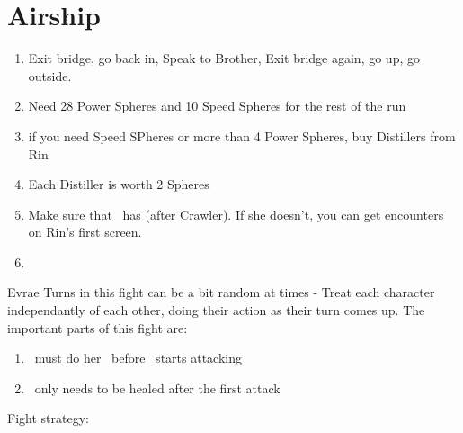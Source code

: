 \chapter{Airship}

\begin{enumerate}
    \item Exit bridge, go back in, Speak to Brother, Exit bridge again, go up, go outside.
    \item Need 28 Power Spheres and 10 Speed Spheres for the rest of the run
    \item if you need Speed SPheres or more than 4 Power Spheres, buy Distillers from Rin
    \item Each Distiller is worth 2 Spheres
    \item Make sure that \rikku\ has \od (after Crawler). If she doesn't, you can get encounters on Rin's first screen.
    \item \save
\end{enumerate}
\begin{battle}[32000]{Evrae}
    Turns in this fight can be a bit random at times - Treat each character independantly of each other, doing their action as their turn comes up.
    The important parts of this fight are:
    \begin{enumerate}
        \item \rikku\ must do her \od\ before \tidus\ starts attacking
        \item \tidus\ only needs to be healed after the first attack
    \end{enumerate}
    Fight strategy:
    \begin{itemize}
    \end{itemize}
\end{battle}
\wincb
